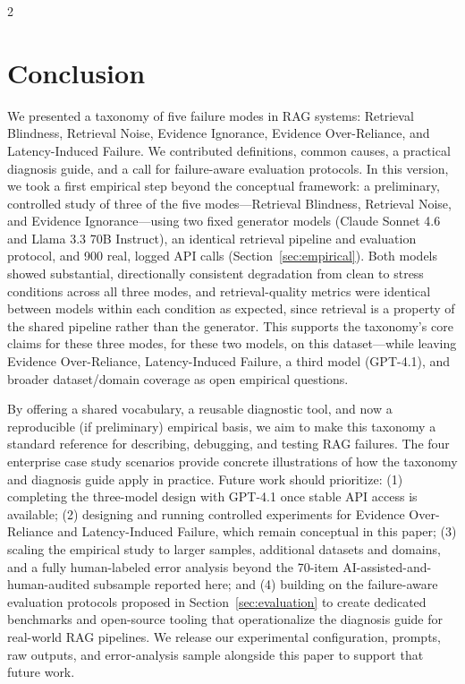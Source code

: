 \documentclass[11pt,a4paper]{article}
\begin{document}
\begin{multicols}{2}
\section{Conclusion}
\label{sec:conclusion}

We presented a taxonomy of five failure modes in RAG systems: Retrieval Blindness, Retrieval Noise, Evidence Ignorance, Evidence Over-Reliance, and Latency-Induced Failure. We contributed definitions, common causes, a practical diagnosis guide, and a call for failure-aware evaluation protocols. In this version, we took a first empirical step beyond the conceptual framework: a preliminary, controlled study of three of the five modes---Retrieval Blindness, Retrieval Noise, and Evidence Ignorance---using two fixed generator models (Claude Sonnet 4.6 and Llama 3.3 70B Instruct), an identical retrieval pipeline and evaluation protocol, and 900 real, logged API calls (Section~\ref{sec:empirical}). Both models showed substantial, directionally consistent degradation from clean to stress conditions across all three modes, and retrieval-quality metrics were identical between models within each condition as expected, since retrieval is a property of the shared pipeline rather than the generator. This supports the taxonomy's core claims for these three modes, for these two models, on this dataset---while leaving Evidence Over-Reliance, Latency-Induced Failure, a third model (GPT-4.1), and broader dataset/domain coverage as open empirical questions.

By offering a shared vocabulary, a reusable diagnostic tool, and now a reproducible (if preliminary) empirical basis, we aim to make this taxonomy a standard reference for describing, debugging, and testing RAG failures. The four enterprise case study scenarios provide concrete illustrations of how the taxonomy and diagnosis guide apply in practice. Future work should prioritize: (1) completing the three-model design with GPT-4.1 once stable API access is available; (2) designing and running controlled experiments for Evidence Over-Reliance and Latency-Induced Failure, which remain conceptual in this paper; (3) scaling the empirical study to larger samples, additional datasets and domains, and a fully human-labeled error analysis beyond the 70-item AI-assisted-and-human-audited subsample reported here; and (4) building on the failure-aware evaluation protocols proposed in Section~\ref{sec:evaluation} to create dedicated benchmarks and open-source tooling that operationalize the diagnosis guide for real-world RAG pipelines. We release our experimental configuration, prompts, raw outputs, and error-analysis sample alongside this paper to support that future work.




\end{multicols}
\end{document}
